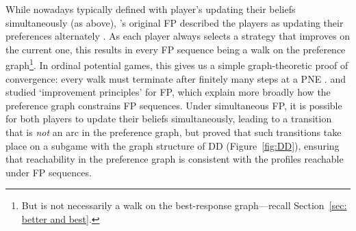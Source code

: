 \documentclass[preprint,authoryear]{elsarticle}
\begin{document}
While nowadays typically defined with player's updating their beliefs simultaneously (as above), \citeauthor{brown1949some}'s original FP described the players as updating their preferences alternately \citep{berger_browns_2007}. As each player always selects a strategy that improves on the current one, this results in every FP sequence being a walk on the preference graph\footnote{But is not necessarily a walk on the best-response graph---recall Section~\ref{sec: better and best}.}. In ordinal potential games, this gives us a simple graph-theoretic proof of convergence: every walk must terminate after finitely many steps at a PNE \citep{berger_browns_2007}. \cite{monderer_fictitious_1997} and \cite{berger_two_2007, berger_browns_2007} studied `improvement principles' for FP, which explain more broadly how the preference graph constrains FP sequences. Under simultaneous FP, it is possible for both players to update their beliefs simultaneously, leading to a transition that is \emph{not} an arc in the preference graph, but \cite{berger_two_2007} proved that such transitions take place on a subgame with the graph structure of DD (Figure~\ref{fig:DD}), ensuring that reachability in the preference graph is consistent with the profiles reachable under FP sequences.

\end{document}
